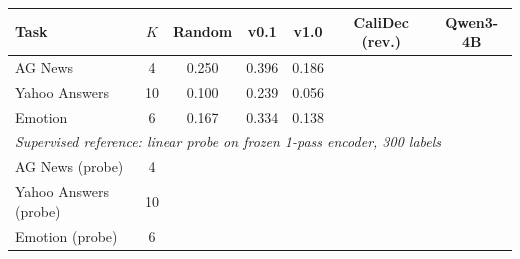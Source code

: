 \begin{tabular}{lcccccc}
\toprule
\textbf{Task} & $K$ & \textbf{Random} & \textbf{v0.1} & \textbf{v1.0} & \textbf{CaliDec (rev.)} & \textbf{Qwen3-4B} \\
\midrule
AG News & 4 & 0.250 & 0.396 & 0.186 & \ph{--} & \ph{--} \\
Yahoo Answers & 10 & 0.100 & 0.239 & 0.056 & \ph{--} & \ph{--} \\
Emotion & 6 & 0.167 & 0.334 & 0.138 & \ph{--} & \ph{--} \\
\midrule
\multicolumn{7}{l}{\textit{Supervised reference: linear probe on frozen 1-pass encoder, 300 labels}} \\
AG News (probe) & 4 & & & & \ph{--} &  \\
Yahoo Answers (probe) & 10 & & & & \ph{--} &  \\
Emotion (probe) & 6 & & & & \ph{--} &  \\
\bottomrule
\end{tabular}
